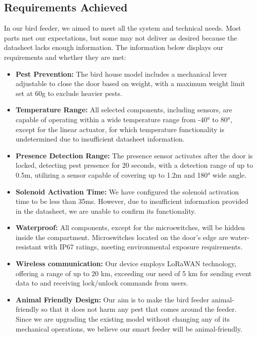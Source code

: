\documentclass[12pt,a4paper]{article}
\begin{document}
\subsection{Requirements Achieved}

In our bird feeder, we aimed to meet all the system and technical needs. Most parts met our expectations, but some may not deliver as desired because the datasheet lacks enough information. The information below displays our requirements and whether they are met:

\begin{itemize}
    \item \textbf{Pest Prevention:} The bird house model includes a mechanical lever adjustable to close the door based on weight, with a maximum weight limit set at 60g to exclude heavier pests.
    
    \item \textbf{Temperature Range:} All selected components, including sensors, are capable of operating within a wide temperature range from -40° to 80°, except for the linear actuator, for which temperature functionality is undetermined due to insufficient datasheet information.
    
    \item \textbf{Presence Detection Range:} The presence sensor activates after the door is locked, detecting pest presence for 20 seconds, with a detection range of up to 0.5m, utilizing a sensor capable of covering up to 1.2m and 180° wide angle.
    
    \item \textbf{Solenoid Activation Time:} We have configured the solenoid activation time to be less than 35ms. However, due to insufficient information provided in the datasheet, we are unable to confirm its functionality.
    
    \item \textbf{Waterproof:} All components, except for the microswitches, will be hidden inside the compartment. Microswitches located on the door's edge are water-resistant with IP67 ratings, meeting environmental exposure requirements.
    
    \item \textbf{Wireless communication:} Our device employs LoRaWAN technology, offering a range of up to 20 km, exceeding our need of 5 km for sending event data to and receiving lock/unlock commands from users.
    
    \item \textbf{Animal Friendly Design:} Our aim is to make the bird feeder animal-friendly so that it does not harm any pest that comes around the feeder. Since we are upgrading the existing model without changing any of its mechanical operations, we believe our smart feeder will be animal-friendly.
    

\end{itemize}
\end{document}
